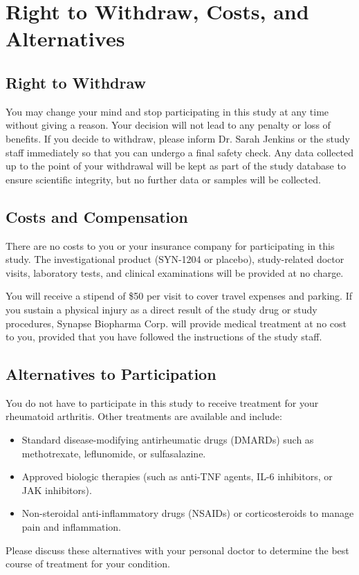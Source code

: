 \section{Right to Withdraw, Costs, and Alternatives}

\subsection{Right to Withdraw}
You may change your mind and stop participating in this study at any time without giving a reason. Your decision will not lead to any penalty or loss of benefits. If you decide to withdraw, please inform Dr. Sarah Jenkins or the study staff immediately so that you can undergo a final safety check. Any data collected up to the point of your withdrawal will be kept as part of the study database to ensure scientific integrity, but no further data or samples will be collected.

\subsection{Costs and Compensation}
There are no costs to you or your insurance company for participating in this study. The investigational product (SYN-1204 or placebo), study-related doctor visits, laboratory tests, and clinical examinations will be provided at no charge. 

You will receive a stipend of \$50 per visit to cover travel expenses and parking. If you sustain a physical injury as a direct result of the study drug or study procedures, Synapse Biopharma Corp. will provide medical treatment at no cost to you, provided that you have followed the instructions of the study staff.

\subsection{Alternatives to Participation}
You do not have to participate in this study to receive treatment for your rheumatoid arthritis. Other treatments are available and include:
\begin{itemize}
    \item Standard disease-modifying antirheumatic drugs (DMARDs) such as methotrexate, leflunomide, or sulfasalazine.
    \item Approved biologic therapies (such as anti-TNF agents, IL-6 inhibitors, or JAK inhibitors).
    \item Non-steroidal anti-inflammatory drugs (NSAIDs) or corticosteroids to manage pain and inflammation.
\end{itemize}
Please discuss these alternatives with your personal doctor to determine the best course of treatment for your condition.
